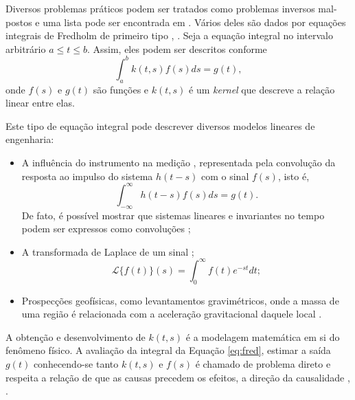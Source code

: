 Diversos problemas práticos podem ser tratados como problemas inversos mal-postos e uma lista pode ser encontrada em \cite[págs. 1-6]{bleyer2015novel}. Vários deles são dados por equações integrais de Fredholm de primeiro tipo \cite[pág. 7]{hansen2010discrete}, \cite[pág. 41]{Mueller2012}. Seja a equação integral no intervalo arbitrário $a\leq t \leq b$. Assim, eles podem ser descritos conforme 
\begin{equation}
\int_a^b k(t,s) f(s) ds = g(t),
\label{eq:fred}
\end{equation}
onde $f(s)$ e $g(t)$ são funções e $k(t,s)$ é um \textit{kernel} que descreve a relação linear entre elas. 

Este tipo de equação integral pode descrever diversos modelos lineares de engenharia:
\begin{itemize}
\item A influência do instrumento na medição \cite[pág. 75]{aster2019parameter}, representada pela convolução da resposta ao impulso do sistema $h(t-s)$ com o sinal $f(s)$, isto é, 
\begin{equation}
\int_{-\infty}^{\infty} h(t-s) f(s) ds = g(t).
\label{eq:deco}
\end{equation}
De fato, é possível mostrar que sistemas lineares e invariantes no tempo podem  ser expressos como convoluções \cite[págs. 211-2]{aster2019parameter};

\item A transformada de Laplace de um sinal \cite[pág. 133]{Mueller2012};
\begin{equation}
\mathcal{L}\{f(t)\}(s)=\int_{0}^{\infty}f(t)e^{-st} dt;
\label{eq:laplace}
\end{equation}
\item Prospecções geofísicas, como levantamentos gravimétricos, onde a massa de uma região é relacionada com a aceleração gravitacional daquele local \cite[pág. 5]{hansen2010discrete}.
\end{itemize}
A obtenção e desenvolvimento de $k(t,s)$ é a modelagem matemática em si do fenômeno físico. A avaliação da integral da Equação \eqref{eq:fred}, estimar a saída $g(t)$ conhecendo-se tanto $k(t,s)$ e $f(s)$ é chamado de problema direto e respeita a relação de que as causas precedem os efeitos, a direção da causalidade \cite[pág. 2]{Calvetti2018a}, \cite[pág. 1]{kaipio2005statistical}. 

